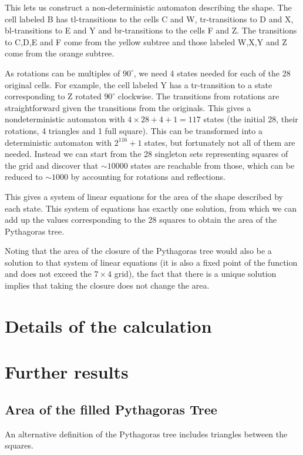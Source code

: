 \documentclass{article}
\begin{document}
This lets us construct a non-deterministic automaton describing the shape. The cell labeled B has tl-transitions to the cells C and W, tr-transitions to D and X, bl-transitions to E and Y and br-transitions to the cells F and Z. The transitions to C,D,E and F come from the yellow subtree and those labeled W,X,Y and Z come from the orange subtree.

As rotations can be multiples of $90^\circ$, we need 4 states needed for each of the 28 original cells. For example, the cell labeled Y has a tr-transition to a state corresponding to Z rotated $90^\circ$ clockwise.  The transitions from rotations are straightforward given the transitions from the originals. This gives a nondeterministic automaton with $4\times28+4+1 = 117$ states (the initial 28, their rotations, 4 triangles and 1 full square). This can be transformed into a deterministic automaton with $2^{116}+1$ states, but fortunately not all of them are needed. Instead we can start from the 28 singleton sets representing squares of the grid and discover that ${\sim}10000$ states are reachable from those, which can be reduced to ${\sim}1000$ by accounting for rotations and reflections.

This gives a system of linear equations for the area of the shape described by each state. This system of equations has exactly one solution, from which we can add up the values corresponding to the 28 squares to obtain the area of the Pythagoras tree.

Noting that the area of the closure of the Pythagoras tree would also be a solution to that system of linear equations (it is also a fixed point of the function and does not exceed the $7\times 4$ grid), the fact that there is a unique solution implies that taking the closure does not change the area.

\section{Details of the calculation}


\section{Further results}
\subsection{Area of the filled Pythagoras Tree}
An alternative definition of the Pythagoras tree includes triangles between the squares.
\end{document}
